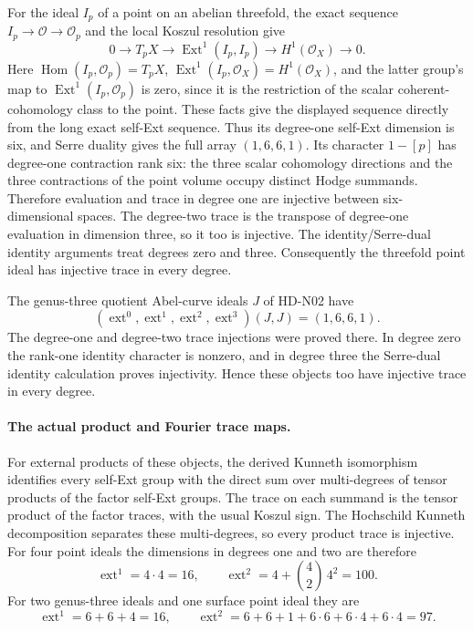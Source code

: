 For the ideal $I_p$ of a point on an abelian threefold, the
exact sequence $I_p\to\mathcal O\to\mathcal O_p$ and the
local Koszul resolution give
\[
 0\longrightarrow T_pX\longrightarrow
 \operatorname{Ext}^1(I_p,I_p)\longrightarrow
 H^1(\mathcal O_X)\longrightarrow0.
\]
Here $\operatorname{Hom}(I_p,\mathcal O_p)=T_pX$,
$\operatorname{Ext}^1(I_p,\mathcal O_X)=H^1(\mathcal O_X)$,
and the latter group's map to
$\operatorname{Ext}^1(I_p,\mathcal O_p)$ is zero, since it is
the restriction of the scalar coherent-cohomology class to
the point. These facts give the displayed sequence directly
from the long exact self-Ext sequence. Thus its degree-one
self-Ext dimension is six, and Serre duality gives the full
array $(1,6,6,1)$. Its character $1-[p]$ has degree-one
contraction rank six: the three scalar cohomology directions
and the three contractions of the point volume occupy distinct
Hodge summands. Therefore evaluation and trace in degree one
are injective between six-dimensional spaces. The degree-two
trace is the transpose of degree-one evaluation in dimension
three, so it too is injective. The identity/Serre-dual identity
arguments treat degrees zero and three. Consequently the
threefold point ideal has injective trace in every degree.

The genus-three quotient Abel-curve ideals $J$ of HD-N02
have
\[
 (\operatorname{ext}^0,\operatorname{ext}^1,
        \operatorname{ext}^2,\operatorname{ext}^3)(J,J)
                    =(1,6,6,1).                           \tag{N14.9}
\]
The degree-one and degree-two trace injections were proved
there. In degree zero the rank-one identity character is
nonzero, and in degree three the Serre-dual identity
calculation proves injectivity. Hence these objects too
have injective trace in every degree.

\paragraph{The actual product and Fourier trace maps.}
For external products of these objects, the derived Kunneth
isomorphism identifies every self-Ext group with the direct
sum over multi-degrees of tensor products of the factor
self-Ext groups. The trace on each summand is the tensor
product of the factor traces, with the usual Koszul sign.
The Hochschild Kunneth decomposition separates these
multi-degrees, so every product trace is injective.
For four point ideals the dimensions in degrees one and two
are therefore
\[
 \operatorname{ext}^1=4\cdot4=16,\qquad
 \operatorname{ext}^2=4+\binom42\,4^2=100.                 \tag{N14.10}
\]
For two genus-three ideals and one surface point ideal they are
\[
 \operatorname{ext}^1=6+6+4=16,\qquad
 \operatorname{ext}^2=6+6+1+6\cdot6+6\cdot4+6\cdot4=97.
                                                               \tag{N14.11}
\]

